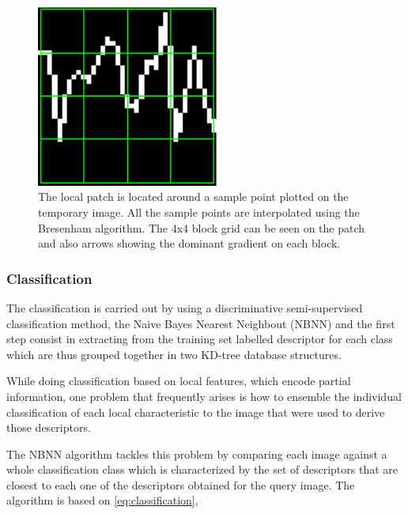 \documentclass[entropy,article,submit,moreauthors,pdftex,10pt,a4paper]{mdpi}
\begin{document}
\begin{figure}[H]
\centering
\includegraphics[width=6cm]{sampledescriptor.png}
\caption{The local patch is located around a sample point plotted on the temporary image. All the sample points are interpolated using the Bresenham algorithm. The 4x4 block grid can be seen on the patch and also arrows showing the dominant gradient on each block.}
\label{fig:sampledescriptor}
\end{figure}


\subsubsection{Classification}

The classification is carried out by using a discriminative semi-supervised classification method, the Naive Bayes Nearest Neighbout (NBNN) \citep{Boiman2008} and the first step consist in extracting from the training set labelled descriptor for each class which are thus grouped together in two KD-tree \citep{Vedaldi2010} database structures.


While doing classification based on local features, which encode partial information, one problem that frequently arises is how to ensemble the individual classification of each local characteristic to the image that were used to derive those descriptors.

The NBNN algorithm tackles this problem by comparing each image against a whole classification class which is characterized by the set of descriptors that are closest to each one of the descriptors obtained for the query image.  The algorithm is based on \ref{eq:classification},
\end{document}
